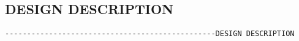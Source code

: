 
\subsection{DESIGN DESCRIPTION}
\begin{verbatim}
------------------------------------------------DESIGN DESCRIPTION
\end{verbatim}





